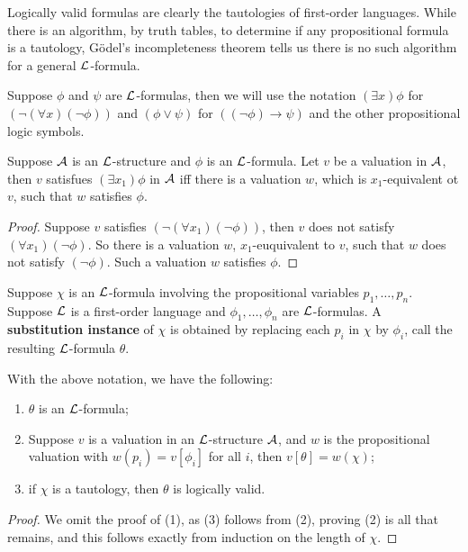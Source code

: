 \documentclass{article}
\begin{document}
Logically valid formulas are clearly the tautologies of first-order languages. While there is an algorithm, by truth tables, to determine if any propositional formula is a tautology, G\"odel's incompleteness theorem tells us there is no such algorithm for a general $\mathcal{L}$-formula.

\begin{definition}
    Suppose $\phi$ and $\psi$ are $\mathcal{L}$-formulas, then we will use the notation $(\exists x)\phi$ for $(\neg(\forall x)(\neg\phi))$ and $(\phi\vee\psi)$ for $((\neg\phi)\rightarrow\psi)$ and the other propositional logic symbols.
\end{definition}

\begin{lemma}
    Suppose $\mathcal{A}$ is an $\mathcal{L}$-structure and $\phi$ is an $\mathcal{L}$-formula. Let $v$ be a valuation in $\mathcal{A}$, then $v$ satisfues $(\exists x_1)\phi$ in $\mathcal{A}$ iff there is a valuation $w$, which is $x_1$-equivalent ot $v$, such that $w$ satisfies $\phi$.
    \begin{proof}
        Suppose $v$ satisfies $(\neg(\forall x_1)(\neg\phi))$, then $v$ does not satisfy $(\forall x_1)(\neg\phi)$. So there is a valuation $w$, $x_1$-euquivalent to $v$, such that $w$ does not satisfy $(\neg \phi)$. Such a valuation $w$ satisfies $\phi$.
    \end{proof}
\end{lemma}

\begin{definition}
    Suppose $\chi$ is an $\mathcal{L}$-formula involving the propositional variables $p_1,\ldots,p_n$. Suppose $\mathcal{L}$ is a first-order language and $\phi_1,\ldots,\phi_n$ are $\mathcal{L}$-formulas. A \textbf{substitution instance} of $\chi$ is obtained by replacing each $p_i$ in $\chi$ by $\phi_i$, call the resulting $\mathcal{L}$-formula $\theta$.
\end{definition}

\begin{theorem}
    With the above notation, we have the following:\begin{enumerate}
        \item $\theta$ is an $\mathcal{L}$-formula;
        \item Suppose $v$ is a valuation in an $\mathcal{L}$-structure $\mathcal{A}$, and $w$ is the propositional valuation with $w(p_i)=v[\phi_i]$ for all $i$, then $v[\theta]=w(\chi)$;
        \item if $\chi$ is a tautology, then $\theta$ is logically valid.
    \end{enumerate}
    \begin{proof}
        We omit the proof of (1), as (3) follows from (2), proving (2) is all that remains, and this follows exactly from induction on the length of $\chi$.
    \end{proof}
\end{theorem}
\end{document}
